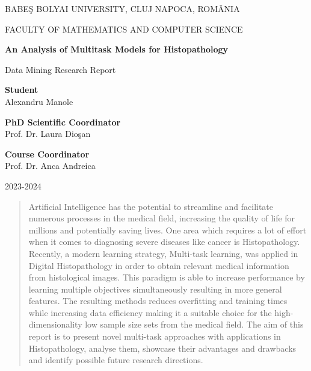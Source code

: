 \documentclass[runningheads,a4paper,11pt]{report}
\begin{document}
\nocite{*}
\begin{titlepage}
\sloppy

\begin{center}
BABE\c S BOLYAI UNIVERSITY, CLUJ NAPOCA, ROM\^ ANIA

FACULTY OF MATHEMATICS AND COMPUTER SCIENCE

\vspace{6cm}

\Huge \textbf{An Analysis of Multitask Models for Histopathology}

\vspace{1cm}

\normalsize Data Mining Research Report

\end{center}


\vspace{4cm}

\begin{flushright}
\Large{\textbf{Student}}\\
Alexandru Manole
\end{flushright}

\begin{flushright}
\Large{\textbf{PhD Scientific Coordinator}}\\
Prof. Dr. Laura Dio\c{s}an
\end{flushright}

\begin{flushright}
\Large{\textbf{Course Coordinator}}\\
Prof. Dr. Anca Andreica
\end{flushright}


\vspace{3cm}

\begin{center}
2023-2024
\end{center}

\end{titlepage}


\begin{abstract}
Artificial Intelligence has the potential to streamline and facilitate numerous processes in the medical field, increasing the quality of life for millions and potentially saving lives. One area which requires a lot of effort when it comes to diagnosing severe diseases like cancer is Histopathology. Recently, a modern learning strategy, Multi-task learning, was applied in Digital Histopathology in order to obtain relevant medical information from histological images. This paradigm is able to increase performance by learning multiple objectives simultaneously resulting in more general features. The resulting methods reduces overfitting and training times while increasing data efficiency making it a suitable choice for the high-dimensionality low sample size sets from the medical field. The aim of this report is to present novel multi-task approaches with applications in Histopathology, analyse them, showcase their advantages and drawbacks and identify possible future research directions.
\end{abstract}
\end{document}
